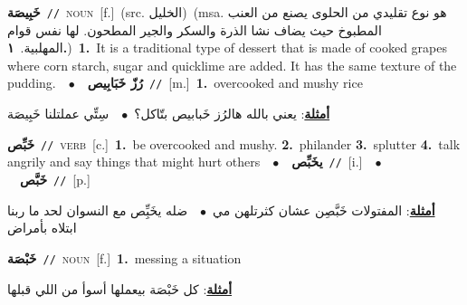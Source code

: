 \documentclass[10pt,a4paper,twoside]{article} %
\begin{document}
\begin{multicols}{2}
{{\setlength\topsep{0pt}\textbf{\foreignlanguage{arabic}{خَبِيصَة}}\ {\color{gray}\texttt{//}\color{black}}\ \textsc{noun}\ [f.]\ (src. \color{gray}\foreignlanguage{arabic}{الخليل}\color{black})\ \color{gray}(msa. \foreignlanguage{arabic}{هو نوع تقليدي من الحلوى يصنع من العنب المطبوخ حيث يضاف نشا الذرة والسكر والجير المطحون. لها نفس قوام المهلبية.}~\foreignlanguage{arabic}{\textbf{١.}})\color{black}\ \textbf{1.}~It is a traditional type of dessert that is made of cooked grapes where corn starch, sugar  and quicklime are added. It has the same texture of the pudding.\ \ $\bullet$\ \ \setlength\topsep{0pt}\textbf{\foreignlanguage{arabic}{رُزّ خَبَابِيص}}\ {\color{gray}\texttt{//}\color{black}}\ [m.]\ \textbf{1.}~overcooked and mushy rice\  \begin{flushright}\color{gray}\foreignlanguage{arabic}{\textbf{\underline{\foreignlanguage{arabic}{أمثلة}}}: يعني بالله هالرُز خَبابيص بتّاكل؟\ $\bullet$\ \  سِتِّي عملتلنا خَبِيصَة}\end{flushright}\color{black}} \vspace{2mm}

{\setlength\topsep{0pt}\textbf{\foreignlanguage{arabic}{خَبِّص}}\ {\color{gray}\texttt{//}\color{black}}\ \textsc{verb}\ [c.]\ \textbf{1.}~be overcooked and mushy.  \textbf{2.}~philander  \textbf{3.}~splutter  \textbf{4.}~talk angrily and say things that might hurt others\ \ $\bullet$\ \ \setlength\topsep{0pt}\textbf{\foreignlanguage{arabic}{يخَبِّص}}\ {\color{gray}\texttt{//}\color{black}}\ [i.]\ \ $\bullet$\ \ \setlength\topsep{0pt}\textbf{\foreignlanguage{arabic}{خَبَّص}}\ {\color{gray}\texttt{//}\color{black}}\ [p.]\  \begin{flushright}\color{gray}\foreignlanguage{arabic}{\textbf{\underline{\foreignlanguage{arabic}{أمثلة}}}: المفتولات خَبَّصِن عشان كثرتلهن مي\ $\bullet$\ \  ضله يخَبِِّص مع النسوان لحد ما ربنا ابتلاه بأمراض}\end{flushright}\color{black}} \vspace{2mm}

{\setlength\topsep{0pt}\textbf{\foreignlanguage{arabic}{خَبْصَة}}\ {\color{gray}\texttt{//}\color{black}}\ \textsc{noun}\ [f.]\ \textbf{1.}~messing a situation\  \begin{flushright}\color{gray}\foreignlanguage{arabic}{\textbf{\underline{\foreignlanguage{arabic}{أمثلة}}}: كل خَبْصَة بيعملها أسوأ من اللي قبلها}\end{flushright}\color{black}} \vspace{2mm}

}
\end{multicols}
\end{document}
